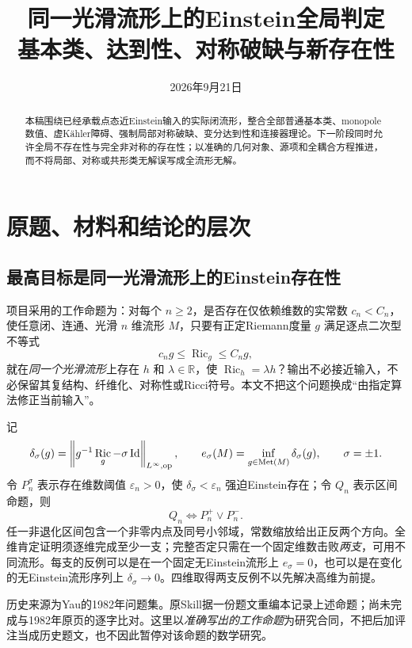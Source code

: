 \documentclass[UTF8,fontset=fandol,zihao=-4]{ctexart}
\title{同一光滑流形上的Einstein全局判定\\[2mm]\large 基本类、达到性、对称破缺与新存在性}
\author{}
\date{2026年9月21日}
\theoremstyle{research}
\DeclareMathOperator{\Ric}{Ric}\DeclareMathOperator{\Rm}{Rm}
\newcommand{\R}{\mathbb R}\newcommand{\Z}{\mathbb Z}\newcommand{\CP}{\mathbb{CP}}
\newcommand{\op}{\mathrm{op}}\newcommand{\dd}{\,d\mu_g}\newcommand{\av}{\fint}
\newcommand{\norm}[1]{\left\|#1\right\|}
\begin{document}
\maketitle
\begin{abstract}
本稿围绕已经承载点态近Einstein输入的实际闭流形，整合全部普通基本类、monopole数值、虚Kähler障碍、强制局部对称破缺、变分达到性和连接器理论。下一阶段同时允许全局不存在性与完全非对称的存在性；以准确的几何对象、源项和全耦合方程推进，而不将局部、对称或共形类无解误写成全流形无解。
\end{abstract}
\tableofcontents
\newpage

\section{原题、材料和结论的层次}\label{sec:common}
\subsection{最高目标是同一光滑流形上的Einstein存在性}
项目采用的工作命题为：对每个 $n\ge2$，是否存在仅依赖维数的实常数 $c_n<C_n$，使任意闭、连通、光滑 $n$ 维流形 $M$，只要有正定Riemann度量 $g$ 满足逐点二次型不等式
\[
 c_ng\le\Ric_g\le C_ng,
\]
就在\emph{同一个光滑流形}上存在 $h$ 和 $\lambda\in\R$，使 $\Ric_h=\lambda h$？输出不必接近输入，不必保留其复结构、纤维化、对称性或Ricci符号。本文不把这个问题换成“由指定算法修正当前输入”。

记
\begin{equation}\label{eq:delta}
 \delta_\sigma(g)=\norm{g^{-1}\Ric_g-\sigma\Id}_{L^\infty,\op},\qquad
 e_\sigma(M)=\inf_{g\in\Met(M)}\delta_\sigma(g),\qquad \sigma=\pm1.
\end{equation}
令 $P_n^\sigma$ 表示存在维数阈值 $\varepsilon_n>0$，使 $\delta_\sigma<\varepsilon_n$ 强迫Einstein存在；令 $Q_n$ 表示区间命题，则
\begin{equation}\label{eq:logic}
 Q_n\iff P_n^+\lor P_n^-.
\end{equation}
任一非退化区间包含一个非零内点及同号小邻域，常数缩放给出正反两个方向。全维肯定证明须逐维完成至少一支；完整否定只需在一个固定维数击败\emph{两支}，可用不同流形。每支的反例可以是在一个固定无Einstein流形上 $e_\sigma=0$，也可以是在变化的无Einstein流形序列上 $\delta_\sigma\to0$。四维取得两支反例不以先解决高维为前提。

历史来源为Yau的1982年问题集\cite{Yau}。原Skill据一份题文重编本记录上述命题；尚未完成与1982年原页的逐字比对。这里以\emph{准确写出的工作命题}为研究合同，不把后加评注当成历史题文，也不因此暂停对该命题的数学研究。
\end{document}
